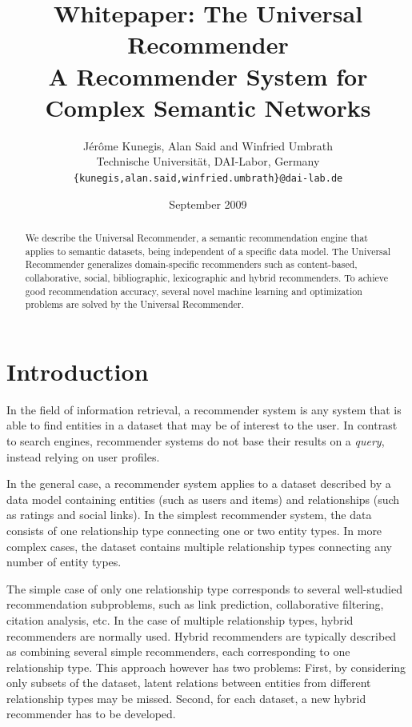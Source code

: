 \documentclass{article}
\begin{document}
\title{
  Whitepaper:  The Universal Recommender \\
  \large{A Recommender System for Complex Semantic Networks}
}
\author{
  Jérôme Kunegis, Alan Said and Winfried Umbrath \\
  \small{Technische Universität, DAI-Labor, Germany} \\
  \texttt{\{kunegis,alan.said,winfried.umbrath\}@dai-lab.de} \\
}

\date{September 2009}

\maketitle

\begin{abstract}
We describe the Universal Recommender, a semantic recommendation engine
that applies to semantic datasets, being
independent of a specific data model.  
The Universal Recommender generalizes domain-specific recommenders such
as content-based, collaborative, social, bibliographic, lexicographic and
hybrid recommenders. 
To achieve good recommendation accuracy, several novel machine learning
and optimization problems are solved by the Universal Recommender.   
\end{abstract}

\section{Introduction}
In the field of information retrieval, a recommender system is any
system that is able to find entities in a dataset that may be of
interest to the user.  In contrast to search engines, recommender systems
do not base their results on a \emph{query}, instead relying on user
profiles. 

In the general case, a recommender system applies to a dataset 
described by a data model containing entities (such as users and
items) and relationships (such as ratings and social links).  
In the simplest recommender system, the data consists of one
relationship type connecting one or two entity types.  In more complex
cases, the dataset contains multiple relationship types connecting any
number of entity types.

The simple case of only one relationship type corresponds to several
well-studied recommendation subproblems, such as link prediction,
collaborative filtering, citation analysis, etc.  In the case of
multiple relationship types, hybrid recommenders are normally used.
Hybrid recommenders are typically described as combining several simple 
recommenders, each corresponding to one relationship type.  This
approach however has two problems:  First, by considering only subsets
of the dataset, latent relations between entities from different
relationship types may be missed.
Second, for each dataset, a new hybrid recommender has to be developed.  
\end{document}
